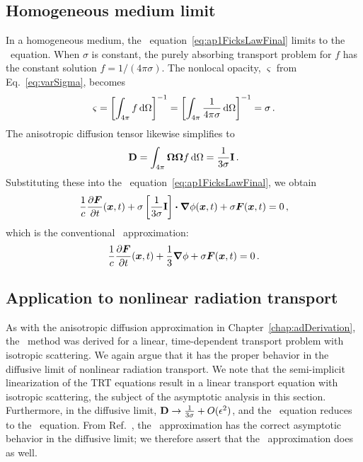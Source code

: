 \subsection{Homogeneous medium limit}
In a homogeneous medium, the \APone\ equation~\eqref{eq:ap1FicksLawFinal} limits
to the \Pone\ equation.
When $\sigma$ is constant, the purely absorbing transport problem for $f$ has the
constant solution $f=1/(4\pi\sigma)$. The nonlocal opacity, $\varsigma$ from
Eq.~\eqref{eq:varSigma}, becomes
\begin{equation*}
  \varsigma
  = \left[ \int_{4\pi} f \mathop{}\!\mathrm{d} \Omega \right]^{-1}
  = \left[ \int_{4\pi} \frac{1}{4\pi\sigma} \mathop{}\!\mathrm{d} \Omega \right]^{-1}
  = \sigma \,.
\end{equation*}
The anisotropic diffusion tensor likewise simplifies to
\begin{equation*}
  \mathbf{D} = \int_{4\pi} \bm{\Omega}\bm{\Omega} f \mathop{}\!\mathrm{d} \Omega =
  \frac{1}{3\sigma}\mathbf{I} \,.
\end{equation*}
Substituting these into the \APone\ equation~\eqref{eq:ap1FicksLawFinal}, we obtain
\begin{equation*}
  \frac{1}{c}\frac{\partial \bm{F}}{\partial t}(\bm{x},t)
  + \sigma \left[ \frac{1}{3\sigma}\mathbf{I} \right] \bm{\cdot} \bm{\nabla} \phi(\bm{x}, t)
  + \sigma\bm{F}(\bm{x},t) 
  = 0 \,,
\end{equation*}
which is the conventional \Pone\ approximation:
\begin{equation*}
  \frac{1}{c}\frac{\partial \bm{F}}{\partial t}(\bm{x},t) + \frac{1}{3} \bm{\nabla} \phi
  + \sigma\bm{F}(\bm{x},t) 
  = 0\,.
\end{equation*}

\subsection{Application to nonlinear radiation transport}

As with the anisotropic diffusion approximation in
Chapter~\ref{chap:adDerivation}, the \APone\ method was derived for a linear,
time-dependent transport problem with isotropic scattering. We again argue that
it has the proper behavior in the diffusive limit of nonlinear radiation
transport. We note that the semi-implicit linearization of the TRT
equations result in a linear transport equation with isotropic scattering, the
subject of the asymptotic analysis in this section.
Furthermore, in the diffusive limit, $\mathbf{D} \to \frac{1}{3\sigma} +
O(\epsilon^2)$, and the \APone\ equation reduces to the \Pone\ equation. From
Ref.~\cite{Mor2000}, the \Pone\ approximation has the correct asymptotic behavior in
the diffusive limit; we therefore assert that the \APone\ approximation does
as well. 


